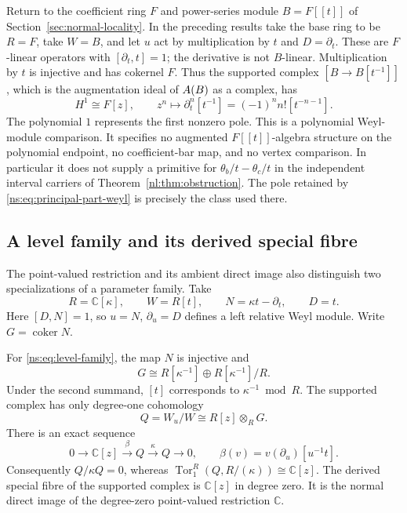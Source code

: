 Return to the coefficient ring \(F\) and power-series module
\(B=F[[t]]\) of Section~\ref{sec:normal-locality}.
In the preceding results take the base ring to be \(R=F\), take
\(W=B\), and let \(u\) act by multiplication by \(t\) and
\(D=\partial_t\).  These are \(F\)-linear operators with
\([\partial_t,t]=1\); the derivative is not \(B\)-linear.
Multiplication by \(t\) is injective and has cokernel \(F\).
Thus the supported complex \([B\to B[t^{-1}]]\), which is the
augmentation ideal of \(A(B)\) as a complex, has
\begin{equation}\label{ns:eq:principal-part-weyl}
 H^1\cong F[z],\qquad
 z^n\longmapsto\partial_t^n[t^{-1}]
          =(-1)^nn![t^{-n-1}].
\end{equation}
The polynomial \(1\) represents the first nonzero pole.
This is a polynomial Weyl-module comparison.  It specifies no
augmented \(F[[t]]\)-algebra structure on the polynomial endpoint,
no coefficient-bar map, and no vertex comparison.
In particular it does not supply a primitive for
\(\theta_b/t-\theta_c/t\) in the independent interval carriers of
Theorem~\ref{nl:thm:obstruction}.  The pole retained by
\eqref{ns:eq:principal-part-weyl} is precisely the class used there.

\subsection{A level family and its derived special fibre}

The point-valued restriction and its ambient direct image also
distinguish two specializations of a parameter family.
Take
\begin{equation}\label{ns:eq:level-family}
 R=\mathbb C[\kappa],\qquad W=R[t],\qquad
 N=\kappa t-\partial_t,\qquad D=t.
\end{equation}
Here \([D,N]=1\), so \(u=N\), \(\partial_u=D\) defines a
left relative Weyl module.  Write \(G=\operatorname{coker}N\).

\begin{theorem}\label{ns:thm:level}
For \eqref{ns:eq:level-family}, the map \(N\) is injective and
\begin{equation}\label{ns:eq:level-cokernel}
 G\cong R[\kappa^{-1}]\oplus R[\kappa^{-1}]/R.
\end{equation}
Under the second summand, \([t]\) corresponds to
\(\kappa^{-1}\bmod R\).  The supported complex has only
degree-one cohomology
\[
 Q=W_u/W\cong R[z]\otimes_R G.
\]
There is an exact sequence
\begin{equation}\label{ns:eq:level-exact}
 0\longrightarrow\mathbb C[z]\xrightarrow{\ \beta\ }Q
       \xrightarrow{\ \kappa\ }Q\longrightarrow0,
 \qquad
 \beta(v)=v(\partial_u)[u^{-1}t].
\end{equation}
Consequently \(Q/\kappa Q=0\), whereas
\(\operatorname{Tor}_1^R(Q,R/(\kappa))\cong\mathbb C[z]\).
The derived special fibre of the supported complex is
\(\mathbb C[z]\) in degree zero.  It is the normal direct image
of the degree-zero point-valued restriction \(\mathbb C\).
\end{theorem}

